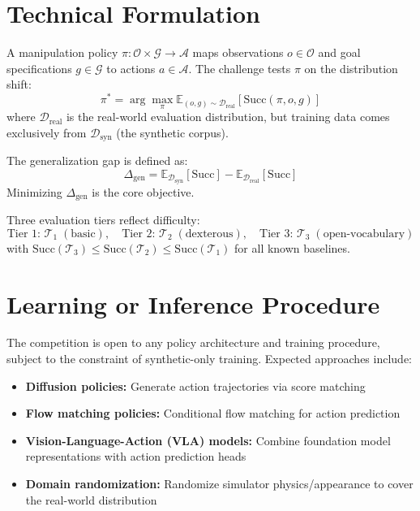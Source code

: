 \documentclass[10pt,twocolumn]{article}
\begin{document}
\section{Technical Formulation}

A manipulation policy $\pi: \mathcal{O} \times \mathcal{G} \to \mathcal{A}$ maps
observations $o \in \mathcal{O}$ and goal specifications $g \in \mathcal{G}$ to
actions $a \in \mathcal{A}$. The challenge tests $\pi$ on the distribution shift:
\[
\pi^* = \arg\max_\pi \mathbb{E}_{(o,g) \sim \mathcal{D}_{\text{real}}}[\mathrm{Succ}(\pi, o, g)]
\]
where $\mathcal{D}_{\text{real}}$ is the real-world evaluation distribution, but
training data comes exclusively from $\mathcal{D}_{\text{syn}}$ (the synthetic corpus).

The generalization gap is defined as:
\[
\Delta_{\mathrm{gen}} = \mathbb{E}_{\mathcal{D}_{\text{syn}}}[\mathrm{Succ}] - \mathbb{E}_{\mathcal{D}_{\text{real}}}[\mathrm{Succ}]
\]
Minimizing $\Delta_{\mathrm{gen}}$ is the core objective.

Three evaluation tiers reflect difficulty:
\[
\text{Tier 1: }\mathcal{T}_1\; (\text{basic}),\quad \text{Tier 2: }\mathcal{T}_2\; (\text{dexterous}),\quad \text{Tier 3: }\mathcal{T}_3\; (\text{open-vocabulary})
\]
with $\mathrm{Succ}(\mathcal{T}_3) \le \mathrm{Succ}(\mathcal{T}_2) \le \mathrm{Succ}(\mathcal{T}_1)$ for all known baselines.

\section{Learning or Inference Procedure}

The competition is open to any policy architecture and training procedure, subject
to the constraint of synthetic-only training. Expected approaches include:
\begin{itemize}[itemsep=2pt,parsep=0pt]
  \item \textbf{Diffusion policies:} Generate action trajectories via score matching
  \item \textbf{Flow matching policies:} Conditional flow matching for action prediction
  \item \textbf{Vision-Language-Action (VLA) models:} Combine foundation model
    representations with action prediction heads
  \item \textbf{Domain randomization:} Randomize simulator physics/appearance
    to cover the real-world distribution
\end{itemize}
\end{document}
